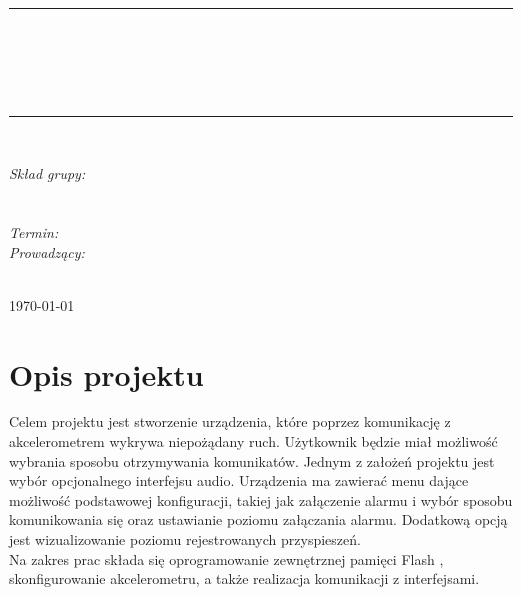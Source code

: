\documentclass[10pt, a4paper]{article}
\begin{document}
\def\tablename{Tabela}	%

\begin{titlepage}
	\begin{center}
		\textsc{\LARGE \formakursu}\\[1cm]		
		\textsc{\Large \kurs}\\[0.5cm]		
		\rule{\textwidth}{0.08cm}\\[0.4cm]
		{\huge \bfseries \doctype}\\[1cm]
		{\huge \bfseries \projectname}\\[0.5cm]
		{\huge \bfseries \acronim}\\[0.4cm]
		\rule{\textwidth}{0.08cm}\\[1cm]
		
		\begin{flushright} \large
		\emph{Skład grupy:}\\
		\osobaA\\
		\osobaB\\[0.4cm]
		
		\emph{Termin: }\termin\\[0.4cm]

		\emph{Prowadzący:} \\
		\prowadzacy \\
		
		\end{flushright}
		
		\vfill
		
		{\large \today}
	\end{center}	
\end{titlepage}

\newpage
\tableofcontents
\newpage

\section{Opis projektu}
\label{sec:OpisProjektu}
Celem projektu jest stworzenie urządzenia, które poprzez komunikację z akcelerometrem wykrywa niepożądany ruch. Użytkownik będzie miał możliwość wybrania sposobu otrzymywania komunikatów. Jednym z założeń projektu jest wybór opcjonalnego interfejsu audio. Urządzenia ma zawierać menu dające możliwość podstawowej konfiguracji, takiej jak załączenie alarmu i wybór sposobu komunikowania się oraz ustawianie poziomu załączania alarmu. Dodatkową opcją jest wizualizowanie poziomu rejestrowanych przyspieszeń. \\ 
Na zakres prac składa się oprogramowanie zewnętrznej pamięci Flash , skonfigurowanie akcelerometru, a także realizacja komunikacji z interfejsami.
\end{document}
